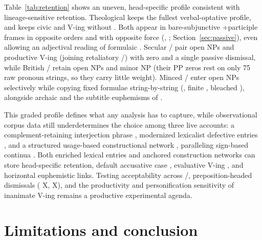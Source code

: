 \documentclass[12pt]{article}
\begin{document}
Table~\ref{tab:retention} shows an uneven, head-specific profile consistent with lineage-sensitive retention. Theological  keeps the fullest verbal-optative profile, and  keeps civic  and  V-ing without . Both appear in bare-subjunctive +participle frames in opposite orders and with opposite force (, ; Section~\ref{sec:passive}), even allowing an adjectival reading of formulaic . Secular / pair open NPs and productive  V-ing (joining retaliatory /) with zero  and a single passive dismissal, while British / retain open NPs and minor NP  (their PP zeros rest on only 75 raw pronoun strings, so they carry little weight). Minced / enter open NPs selectively while copying fixed formulae string-by-string (, finite , bleached ), alongside archaic  and the subtitle euphemisms of .

This graded profile defines what any analysis has to capture, while observational corpus data still underdetermines the choice among three live accounts: a complement-retaining interjection phrase \citep[1361 n.\ 70]{huddleston2002,amekawilkins2006}, modernized lexicalist defective entries \citep{quang1971,mullerwechsler2014}, and a structured usage-based constructional network \citep{goldberg2003,goldberg2019,croft2001,bybee2010,diessel2019,schmid2020}, paralleling sign-based continua \citep{sag2012sign}. Both enriched lexical entries and anchored construction networks can store head-specific retention, default accusative case \citep{schutze2001}, evaluative  V-ing \citep{fillmore1971}, and horizontal euphemistic links. Testing acceptability across /, preposition-headed dismissals ( X,  X), and the productivity and personification sensitivity of inanimate  V-ing remains a productive experimental agenda.

\section{Limitations and conclusion}
\label{sec:conclusion}
\end{document}
